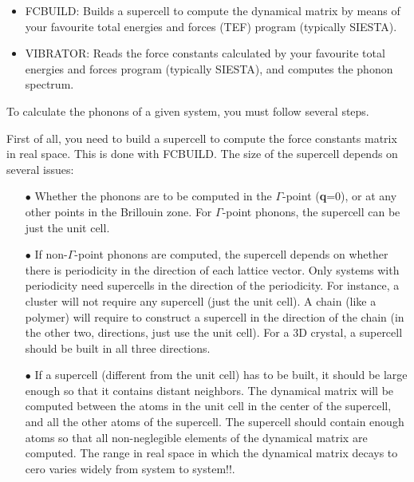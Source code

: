 \begin{itemize}
\item
FCBUILD:  Builds a supercell to compute the dynamical matrix 
by means of your favourite total energies and forces (TEF)
program (typically SIESTA).
\item
VIBRATOR:  Reads the force constants calculated
by your favourite total energies and forces
program (typically SIESTA), and computes the phonon spectrum.
\end{itemize}

\noindent
To calculate the phonons of a given system, you must follow
several steps. 

\noindent
First of all, you need to build a supercell
to compute the force constants matrix in real space.
This is done with FCBUILD.
The size of the supercell depends on several issues:

\begin{itemize}

\item[$\bullet$]  Whether  the phonons are to be
computed in the $\Gamma$-point ({\bf q}=0), or at any other
points in the Brillouin zone.
For $\Gamma$-point phonons, the supercell can be 
just the unit cell.

\item[$\bullet$]  If non-$\Gamma$-point phonons are computed,
the supercell depends on 
whether there is periodicity in the direction
of each lattice vector.  Only systems with periodicity need
supercells in the direction of the periodicity.
For instance, a cluster will not require any supercell (just the unit
cell). A chain (like a polymer) will require 
to construct a supercell in the direction of the chain
(in the other two, directions, just use the unit cell).
For a 3D crystal, a supercell should be built in all three
directions. 


\item[$\bullet$]  If a supercell (different from the unit cell)
has to be built,
it should be large enough so that it contains distant
neighbors. The dynamical matrix will be computed 
between the atoms in the unit cell in the center of
the supercell, and all the other atoms of the supercell. The
supercell should contain enough atoms so that all
non-neglegible elements of the dynamical matrix
are computed.   The range in real space in which
the dynamical matrix decays to cero varies widely
from system to system!!.

\end{itemize}

